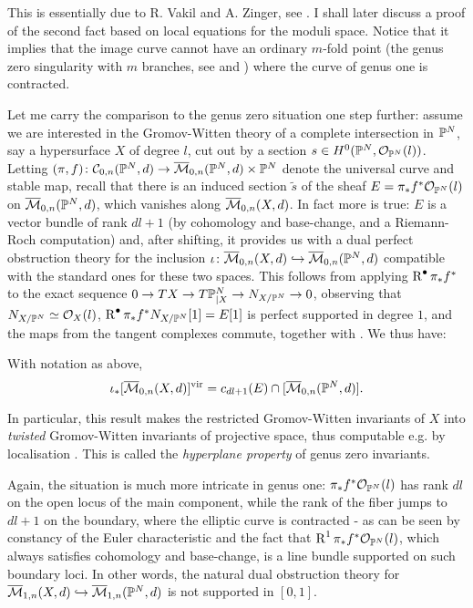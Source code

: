 This is essentially due to R. Vakil and A. Zinger, see \cite[Lemma~5.9]{Vre} \cite[\S 1.2]{VZ}. I shall later discuss a proof of the second fact based on local equations for the moduli space. Notice that it implies that the image curve cannot have an ordinary $m$-fold point (the genus zero singularity with $m$ branches, see \cite[p.98]{HM} and \cite[Appendix A]{SMY1}) where the curve of genus one is contracted.

Let me carry the comparison to the genus zero situation one step further: assume we are interested in the Gromov-Witten theory of a complete intersection in $\mathbb P^N$, say a hypersurface $X$ of degree $l$, cut out by a section $s\in H^0(\mathbb P^N,\mathcal{O}_{\mathbb P^N}(l))$. Letting $(\pi,f)\colon \mathcal C_{0,n}(\mathbb P^N,d) \rightarrow \overline{\mathcal{M}}_{0,n}(\mathbb P^N,d)\times \mathbb P^N$ denote the universal curve and stable map, recall that there is an induced section $\tilde{s}$ of the sheaf $E=\pi_*f^*\mathcal{O}_{\mathbb P^N}(l)$ on $\overline{\mathcal{M}}_{0,n}(\mathbb P^N,d)$, which vanishes along $\overline{\mathcal{M}}_{0,n}(X,d)$. In fact more is true: $E$ is a vector bundle of rank $dl+1$ (by cohomology and base-change, and a Riemann-Roch computation) and, after shifting, it provides us with a dual perfect obstruction theory for the inclusion $\iota\colon \overline{\mathcal{M}}_{0,n}(X,d)\hookrightarrow\overline{\mathcal{M}}_{0,n}(\mathbb P^N,d)$ compatible with the standard ones for these two spaces. This follows from applying $\operatorname{R}^{\bullet}\pi_*f^*$ to the exact sequence $0\rightarrow TX\rightarrow T\mathbb P^N_{|X}\rightarrow N_{X/\mathbb P^N}\rightarrow 0$, observing that $N_{X/\mathbb P^N}\simeq \mathcal{O}_X(l)$, $\operatorname{R}^{\bullet}\pi_*f^*N_{X/\mathbb P^N}[1]=E[1]$ is perfect supported in degree $1$, and the maps from the tangent complexes commute, together with \cite[Proposition 14.1(a)]{Ful}. We thus have:

\begin{prop}\cite{CKL,KKP}
 With notation as above,
 \[\iota_*[\overline{\mathcal{M}}_{0,n}(X,d)]^{\mathrm{vir}}=c_{dl+1}(E)\cap [\overline{\mathcal{M}}_{0,n}(\mathbb P^N,d)].\]
\end{prop}
In particular, this result makes the restricted Gromov-Witten invariants of $X$ into \emph{twisted} Gromov-Witten invariants of projective space, thus computable e.g. by localisation \cite{KON}. This is called the \emph{hyperplane property} of genus zero invariants.

Again, the situation is much more intricate in genus one: $\pi_*f^*\mathcal{O}_{\mathbb P^N}(l)$ has rank $dl$ on the open locus of the main component, while the rank of the fiber jumps to $dl+1$ on the boundary, where the elliptic curve is contracted - as can be seen by constancy of the Euler characteristic and the fact that $\operatorname{R}^1\pi_*f^*\mathcal{O}_{\mathbb P^N}(l)$, which always satisfies cohomology and base-change, is a line bundle supported on such boundary loci. In other words, the natural dual obstruction theory for $\overline{\mathcal{M}}_{1,n}(X,d)\hookrightarrow\overline{\mathcal{M}}_{1,n}(\mathbb P^N,d)$ is not supported in $[0,1]$.

